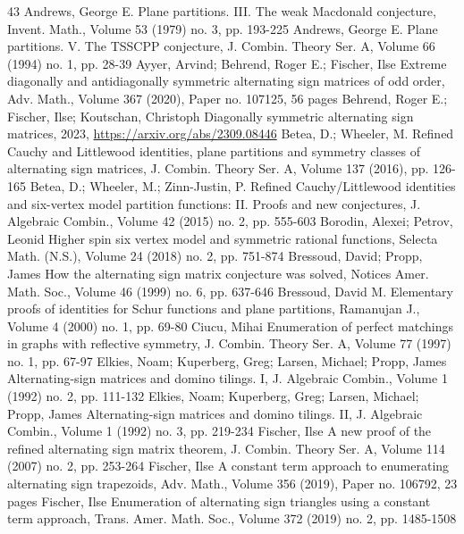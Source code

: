 \documentclass[10pt,a4paper]{article}
\theoremstyle{definition}
\begin{document}
\begin{thebibliography}{43}
 Andrews, George E. Plane partitions. III. The weak Macdonald conjecture, Invent. Math., Volume 53 (1979) no. 3, pp. 193-225
 Andrews, George E. Plane partitions. V. The TSSCPP conjecture, J. Combin. Theory Ser. A, Volume 66 (1994) no. 1, pp. 28-39
 Ayyer, Arvind; Behrend, Roger E.; Fischer, Ilse Extreme diagonally and antidiagonally symmetric alternating sign matrices of odd order, Adv. Math., Volume 367 (2020), Paper no. 107125, 56 pages
 Behrend, Roger E.; Fischer, Ilse; Koutschan, Christoph Diagonally symmetric alternating sign matrices, 2023, \url{https://arxiv.org/abs/2309.08446}
 Betea, D.; Wheeler, M. Refined Cauchy and Littlewood identities, plane partitions and symmetry classes of alternating sign matrices, J. Combin. Theory Ser. A, Volume 137 (2016), pp. 126-165
 Betea, D.; Wheeler, M.; Zinn-Justin, P. Refined Cauchy/Littlewood identities and six-vertex model partition functions: II. Proofs and new conjectures, J. Algebraic Combin., Volume 42 (2015) no. 2, pp. 555-603
 Borodin, Alexei; Petrov, Leonid Higher spin six vertex model and symmetric rational functions, Selecta Math. (N.S.), Volume 24 (2018) no. 2, pp. 751-874
 Bressoud, David; Propp, James How the alternating sign matrix conjecture was solved, Notices Amer. Math. Soc., Volume 46 (1999) no. 6, pp. 637-646
 Bressoud, David M. Elementary proofs of identities for Schur functions and plane partitions, Ramanujan J., Volume 4 (2000) no. 1, pp. 69-80
 Ciucu, Mihai Enumeration of perfect matchings in graphs with reflective symmetry, J. Combin. Theory Ser. A, Volume 77 (1997) no. 1, pp. 67-97
 Elkies, Noam; Kuperberg, Greg; Larsen, Michael; Propp, James Alternating-sign matrices and domino tilings. I, J. Algebraic Combin., Volume 1 (1992) no. 2, pp. 111-132
 Elkies, Noam; Kuperberg, Greg; Larsen, Michael; Propp, James Alternating-sign matrices and domino tilings. II, J. Algebraic Combin., Volume 1 (1992) no. 3, pp. 219-234
 Fischer, Ilse A new proof of the refined alternating sign matrix theorem, J. Combin. Theory Ser. A, Volume 114 (2007) no. 2, pp. 253-264
 Fischer, Ilse A constant term approach to enumerating alternating sign trapezoids, Adv. Math., Volume 356 (2019), Paper no. 106792, 23 pages
 Fischer, Ilse Enumeration of alternating sign triangles using a constant term approach, Trans. Amer. Math. Soc., Volume 372 (2019) no. 2, pp. 1485-1508

\end{thebibliography}
\end{document}
